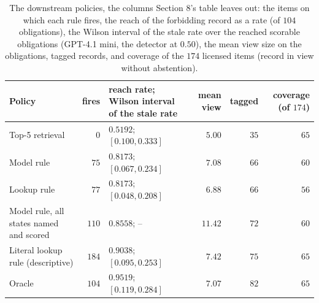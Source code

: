 \begin{table}[H]
\caption{The downstream policies, the columns Section 8's table leaves out: the items on which each rule fires, the reach of the forbidding record as a rate (of $104$ obligations), the Wilson interval of the stale rate over the reached scorable obligations (GPT-4.1 mini, the detector at $0.50$), the mean view size on the obligations, tagged records, and coverage of the $174$ licensed items (record in view without abstention).}
\label{tab:ds-body-lower}
\centering
\scriptsize
\setlength{\tabcolsep}{3pt}
\begin{tabular}{@{}lrlrrr@{}}
\toprule
Policy & fires & reach rate; Wilson interval of the stale rate & mean view & tagged & coverage (of $174$) \\
\midrule
Top-5 retrieval & $0$ & $0.5192$; $[0.100,0.333]$ & $5.00$ & $35$ & $65$ \\
Model rule & $75$ & $0.8173$; $[0.067,0.234]$ & $7.08$ & $66$ & $60$ \\
Lookup rule & $77$ & $0.8173$; $[0.048,0.208]$ & $6.88$ & $66$ & $56$ \\
Model rule, all states named and scored & $110$ & $0.8558$; -- & $11.42$ & $72$ & $60$ \\
Literal lookup rule (descriptive) & $184$ & $0.9038$; $[0.095,0.253]$ & $7.42$ & $75$ & $65$ \\
Oracle & $104$ & $0.9519$; $[0.119,0.284]$ & $7.07$ & $82$ & $65$ \\
\bottomrule
\end{tabular}
\end{table}

